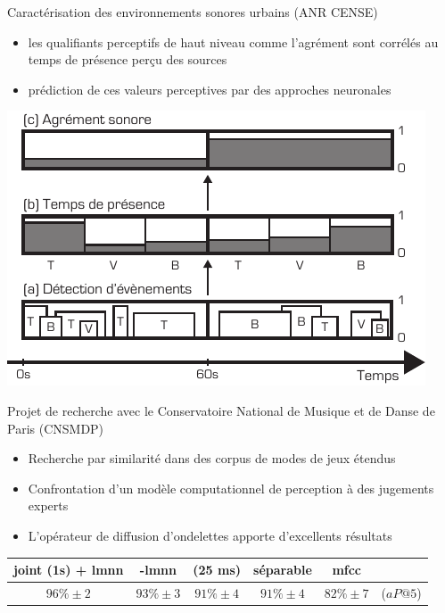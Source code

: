 \begin{frame}{Caractérisation des environnements sonores urbains (ANR CENSE)}
  \begin{minipage}{.5\columnwidth}
    \begin{itemize}
    \item les qualifiants perceptifs de haut niveau comme l'agrément sont corrélés au temps de présence perçu des sources
    \item prédiction de ces valeurs perceptives par des approches neuronales
    \end{itemize}
  \end{minipage}
  \begin{minipage}{.4\columnwidth}
    \begin{center}
    \includegraphics[width=\columnwidth]{figures/block} \\
    \end{center}
  \end{minipage}
\end{frame}

\begin{frame}{Projet de recherche avec le Conservatoire National de Musique et de Danse de Paris (CNSMDP)}
\begin{itemize}
\item Recherche par similarité dans des corpus de modes de jeux étendus
\item Confrontation d'un modèle computationnel de perception à des jugements experts
\item L'opérateur de diffusion d'ondelettes apporte d'excellents résultats
\end{itemize}
\begin{table}
\small
    \centering
{\footnotesize
\begin{tabular}{c|ccccc}
 joint (1s) + lmnn & -lmnn & (25 ms) &  séparable & mfcc & \\
      \hline
 $96\% \pm 2$ & $93\% \pm 3$ & $91\% \pm 4$ & $91\% \pm 4$ & $82\% \pm 7$ & ($aP@5$)\\
\end{tabular}
}
\end{table}
\end{frame}

